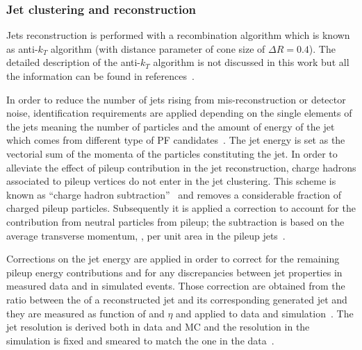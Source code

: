 \subsubsection{Jet clustering and reconstruction}\label{sec:jetclustering}
Jets reconstruction is performed with a recombination algorithm which
is known as anti-$k_T$ algorithm (with distance parameter of cone size
of $\Delta R = 0.4$). The detailed description of the anti-$k_T$ algorithm is not
discussed in this work but all the information can be found in 
references~\cite{Cacciari_2008,Cacciari_2012}.

In order to reduce the number of jets rising from mis-reconstruction or
detector noise, identification requirements are applied depending on the single elements of the
jets meaning the number of particles and the amount of energy of the
jet which comes from different type of PF candidates~\cite{CMS-PAS-JME-16-003}.
The jet energy is set as the vectorial sum of the momenta of the
particles constituting the jet. In order to alleviate the effect of
pileup contribution in the jet reconstruction, charge hadrons
associated to pileup vertices do not enter in the jet clustering. This
scheme is known as ``charge hadron
subtraction''~\cite{CMS-PAS-JME-14-001} and removes a
considerable fraction of charged pileup particles.  
Subsequently it is applied a correction to account for the
contribution from neutral particles from pileup; the subtraction is
based on the average transverse momentum, \pt, per unit area in the
pileup jets~\cite{CACCIARI2008119, Cacciari_2008_area,
  Sirunyan:2020foa}.

Corrections on the jet energy are applied in order to correct for the
remaining pileup energy contributions and for any discrepancies
between jet properties in measured data and in simulated events. Those
correction are obtained from the ratio between the \pt of a
reconstructed jet and its corresponding generated jet and they are
measured as function of \pt and $\eta$ and applied to data and
simulation~\cite{Khachatryan_2017}. The jet \pt resolution is
derived both in data and MC and the resolution in the simulation is
fixed and smeared to match the one in the
data~\cite{Khachatryan_2017}.

